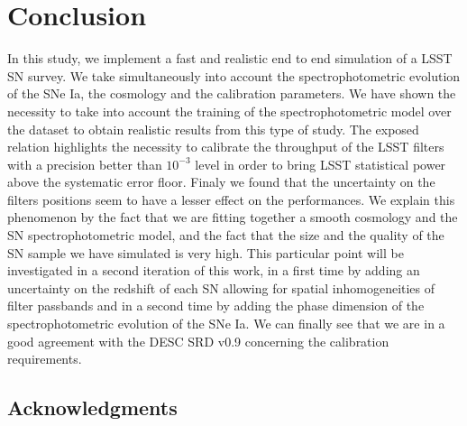 \documentclass[\docopts]{\docclass}
\begin{document}


\section{Conclusion}
\label{sec::conclusions}
In this study, we implement a fast and realistic end to end simulation
of a LSST SN survey.  We take simultaneously into account the
spectrophotometric evolution of the SNe Ia, the cosmology and the
calibration parameters.  We have shown the necessity to take into
account the training of the spectrophotometric model over the dataset
to obtain realistic results from this type of study.  The exposed
relation highlights the necessity to calibrate the throughput of the
LSST filters with a precision better than $10^{-3}$ level in order to
bring LSST statistical power above the systematic error floor. Finaly
we found that the uncertainty on the filters positions seem to have a
lesser effect on the performances.  We explain this phenomenon by the
fact that we are fitting together a smooth cosmology and the SN
spectrophotometric model, and the fact that the size and the quality
of the SN sample we have simulated is very high.  This particular
point will be investigated in a second iteration of this work, in a
first time by adding an uncertainty on the redshift of each SN
allowing for spatial inhomogeneities of filter passbands and in a
second time by adding the phase dimension of the spectrophotometric
evolution of the SNe Ia. We can finally see that we are in a good
agreement with the DESC SRD v0.9 concerning the calibration
requirements.



\subsection*{Acknowledgments}


%





\end{document}
